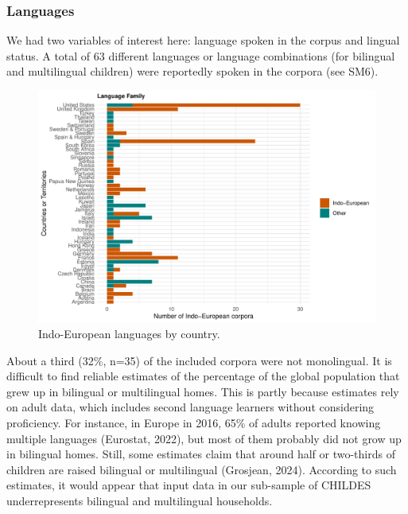 \documentclass[
  man,floatsintext]{apa6}
\begin{document}
\hypertarget{languages-1}{%
\subsubsection{Languages}\label{languages-1}}

We had two variables of interest here: language spoken in the corpus and lingual status. A total of 63 different languages or language combinations (for bilingual and multilingual children) were reportedly spoken in the corpora (see SM6).

\begin{figure}
\centering
\includegraphics{CHILDES_short_files/figure-latex/figure7-1.pdf}
\caption{\label{fig:figure7}Indo-European languages by country.}
\end{figure}

About a third (32\%, n=35) of the included corpora were not monolingual. It is difficult to find reliable estimates of the percentage of the global population that grew up in bilingual or multilingual homes. This is partly because estimates rely on adult data, which includes second language learners without considering proficiency. For instance, in Europe in 2016, 65\% of adults reported knowing multiple languages (Eurostat, 2022), but most of them probably did not grow up in bilingual homes. Still, some estimates claim that around half or two-thirds of children are raised bilingual or multilingual (Grosjean, 2024). According to such estimates, it would appear that input data in our sub-sample of CHILDES underrepresents bilingual and multilingual households.
\end{document}

